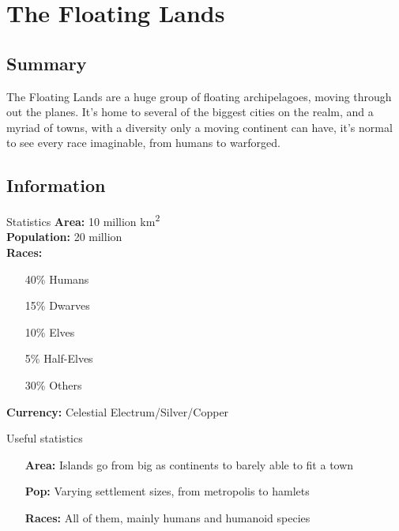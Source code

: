 


\chapter{The Floating Lands}
\section{Summary}
The Floating Lands are a huge group of floating archipelagoes, moving through out the planes. It's home to several of the biggest cities on the realm, and a myriad of towns, with a diversity only a moving continent can have, it's normal to see every race imaginable, from humans to warforged.

\section{Information}

\begin{monsterbox}{Statistics}
    \textbf{Area:} 10 million \si{\square\kilo\meter}\\

    \textbf{Population:} 20 million\\

    \textbf{Races:}
    \begin{itemize}[leftmargin=1.3cm, labelsep=0.2cm]
        \item[40\%] Humans
        \item[15\%] Dwarves
        \item[10\%] Elves
        \item[5\%] Half-Elves
        \item[30\%]  Others
    \end{itemize}

    \textbf{Currency:}    Celestial Electrum/Silver/Copper   \\
\end{monsterbox}

\begin{monsterbox}{Useful statistics}
    \begin{itemize}[leftmargin=1.2cm, labelsep=0.2cm]
        \item[\textbf{Area:}] Islands go from big as continents to barely able to fit a town
        \item[\textbf{Pop:}] Varying settlement sizes, from metropolis to hamlets
        \item[\textbf{Races:}] All of them, mainly humans and humanoid species
    \end{itemize}
\end{monsterbox}


